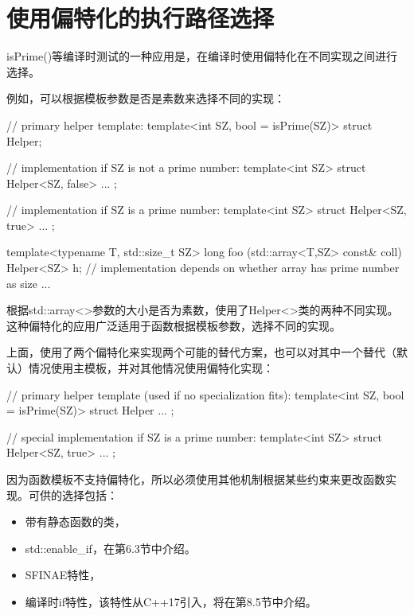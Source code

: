 \section{使用偏特化的执行路径选择}
isPrime()等编译时测试的一种应用是，在编译时使用偏特化在不同实现之间进行选择。

例如，可以根据模板参数是否是素数来选择不同的实现：

\begin{cpp}
// primary helper template:
template<int SZ, bool = isPrime(SZ)>
struct Helper;

// implementation if SZ is not a prime number:
template<int SZ>
struct Helper<SZ, false> {
	...
};

// implementation if SZ is a prime number:
template<int SZ>
struct Helper<SZ, true> {
	...
};

template<typename T, std::size_t SZ>
long foo (std::array<T,SZ> const& coll) {
	Helper<SZ> h; // implementation depends on whether array has prime number as size
	...
}
\end{cpp}

根据std::array<>参数的大小是否为素数，使用了Helper<>类的两种不同实现。这种偏特化的应用广泛适用于函数根据模板参数，选择不同的实现。

上面，使用了两个偏特化来实现两个可能的替代方案，也可以对其中一个替代（默认）情况使用主模板，并对其他情况使用偏特化实现：

\begin{cpp}
// primary helper template (used if no specialization fits):
template<int SZ, bool = isPrime(SZ)>
struct Helper
{
	...
};

// special implementation if SZ is a prime number:
template<int SZ>
struct Helper<SZ, true> {
	...
};
\end{cpp}

因为函数模板不支持偏特化，所以必须使用其他机制根据某些约束来更改函数实现。可供的选择包括：

\begin{itemize}
\item 
带有静态函数的类，

\item 
std::enable\_if，在第6.3节中介绍。

\item 
SFINAE特性，

\item 
编译时if特性，该特性从C++17引入，将在第8.5节中介绍。
\end{itemize}

